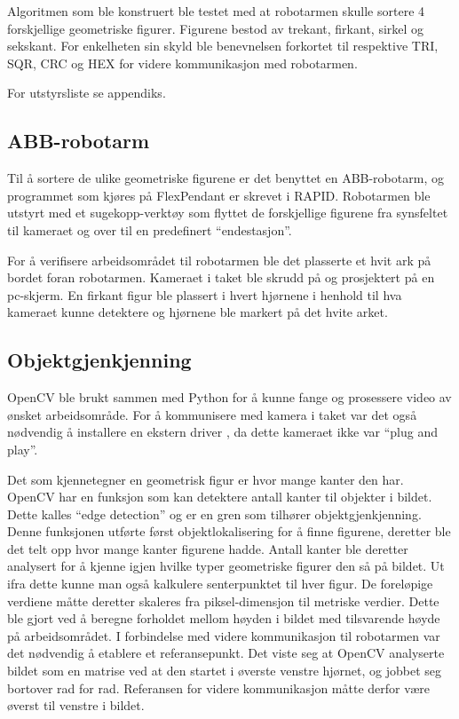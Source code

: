 \documentclass[conference]{IEEEtran}
\begin{document}
    Algoritmen som ble konstruert ble testet med at robotarmen skulle sortere 4 forskjellige geometriske figurer. Figurene bestod av trekant, 
    firkant, sirkel og sekskant. For enkelheten sin skyld ble benevnelsen forkortet til respektive TRI, SQR, CRC og HEX for videre kommunikasjon 
    med robotarmen. 
    
    For utstyrsliste se appendiks. 
    
    \subsection{ABB-robotarm}
        Til å sortere de ulike geometriske figurene er det benyttet en ABB-robotarm, og programmet som kjøres på FlexPendant er skrevet i RAPID. 
        Robotarmen ble utstyrt med et sugekopp-verktøy som flyttet de forskjellige figurene fra synsfeltet til kameraet og over til en predefinert 
        “endestasjon”. 

        For å verifisere arbeidsområdet til robotarmen ble det plasserte et hvit ark på bordet foran robotarmen. Kameraet i taket ble skrudd på og 
        prosjektert på en pc-skjerm. En firkant figur ble plassert i hvert hjørnene i henhold til hva kameraet kunne detektere og hjørnene ble markert 
        på det hvite arket.

    \subsection{Objektgjenkjenning}
        OpenCV ble brukt sammen med Python for å kunne fange og prosessere video av ønsket arbeidsområde. For å kommunisere med kamera i taket 
        var det også nødvendig å installere en ekstern driver \cite{metode:kamera}, da dette kameraet ikke var “plug and play”.

        Det som kjennetegner en geometrisk figur er hvor mange kanter den har. OpenCV har en funksjon som kan detektere antall kanter til objekter 
        i bildet. Dette kalles “edge detection” og er en gren som tilhører objektgjenkjenning. Denne funksjonen utførte først objektlokalisering 
        for å finne figurene, deretter ble det telt opp hvor mange kanter figurene hadde. Antall kanter ble deretter analysert for å kjenne igjen 
        hvilke typer geometriske figurer den så på bildet. Ut ifra dette kunne man også kalkulere senterpunktet til hver figur. De foreløpige verdiene 
        måtte deretter skaleres fra piksel-dimensjon til metriske verdier. Dette ble gjort ved å beregne forholdet mellom høyden i bildet med tilsvarende 
        høyde på arbeidsområdet. I forbindelse med videre kommunikasjon til robotarmen var det nødvendig å etablere et referansepunkt.  Det viste seg at 
        OpenCV analyserte bildet som en matrise ved at den startet i øverste venstre hjørnet, og jobbet seg bortover rad for rad. Referansen for videre 
        kommunikasjon måtte derfor være øverst til venstre i bildet.
\end{document}
